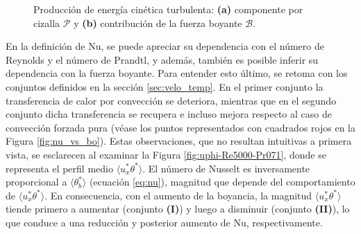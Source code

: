 \begin{figure}[H]
  \centering
  \caption{Producción de energía cinética turbulenta: \textbf{(a)} componente por cizalla $\mathcal{P}$ y \textbf{(b)} contribución de la fuerza boyante $\mathcal{B}$.}
  \label{fig:budgets_prod}
\end{figure}

En la definición de Nu, se puede apreciar su dependencia con el número de Reynolds y el número de Prandtl, y además, también es posible inferir su dependencia con la fuerza boyante. Para entender esto último, se retoma con los conjuntos definidos en la sección \ref{sec:velo_temp}. En el primer conjunto la transferencia de calor por convección se deteriora, mientras que en el segundo conjunto dicha transferencia se recupera e incluso mejora respecto al caso de convección forzada pura (véase los puntos representados con cuadrados rojos en la Figura \ref{fig:nu_vs_bo}). Estas observaciones, que no resultan intuitivas a primera vista, se esclarecen al examinar la Figura \ref{fig:uphi-Re5000-Pr071}, donde se representa el perfil medio $\langle u_x^{*}\theta^{*}\rangle$. El número de Nusselt es inversamente proporcional a $\langle\theta^{*}_b\rangle$ (ecuación \ref{eq:nu}), magnitud que depende del comportamiento de $\langle u_x^{*}\theta^{*}\rangle$. En consecuencia, con el aumento de la boyancia, la magnitud  $\langle u_x^{*}\theta^{*}\rangle$ tiende primero a aumentar (conjunto \textbf{(I)}) y luego a disminuir (conjunto \textbf{(II)}), lo que conduce a una reducción y posterior aumento de Nu, respectivamente. 

